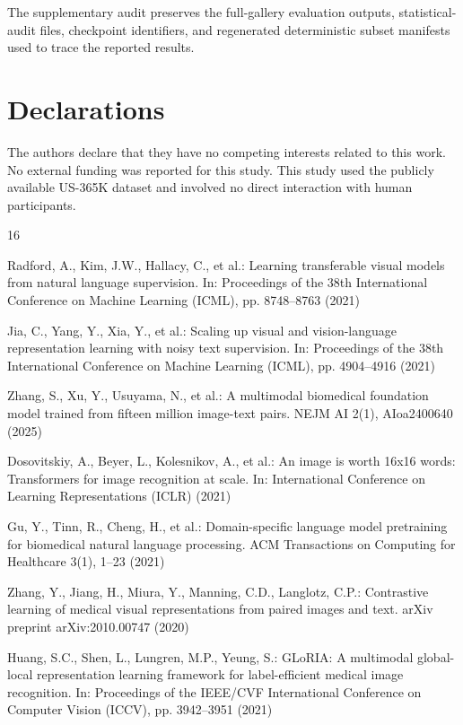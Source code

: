 \documentclass[runningheads]{llncs}
\begin{document}
The supplementary audit preserves the full-gallery evaluation outputs, statistical-audit files, checkpoint identifiers, and regenerated deterministic subset manifests used to trace the reported results.

\section*{Declarations}
The authors declare that they have no competing interests related to this work. No external funding was reported for this study. This study used the publicly available US-365K dataset and involved no direct interaction with human participants.

\begin{thebibliography}{16}
\scriptsize

Radford, A., Kim, J.W., Hallacy, C., et al.: Learning transferable visual models from natural language supervision. In: Proceedings of the 38th International Conference on Machine Learning (ICML), pp. 8748--8763 (2021)

Jia, C., Yang, Y., Xia, Y., et al.: Scaling up visual and vision-language representation learning with noisy text supervision. In: Proceedings of the 38th International Conference on Machine Learning (ICML), pp. 4904--4916 (2021)

Zhang, S., Xu, Y., Usuyama, N., et al.: A multimodal biomedical foundation model trained from fifteen million image-text pairs. NEJM AI 2(1), AIoa2400640 (2025)

Dosovitskiy, A., Beyer, L., Kolesnikov, A., et al.: An image is worth 16x16 words: Transformers for image recognition at scale. In: International Conference on Learning Representations (ICLR) (2021)

Gu, Y., Tinn, R., Cheng, H., et al.: Domain-specific language model pretraining for biomedical natural language processing. ACM Transactions on Computing for Healthcare 3(1), 1--23 (2021)

Zhang, Y., Jiang, H., Miura, Y., Manning, C.D., Langlotz, C.P.: Contrastive learning of medical visual representations from paired images and text. arXiv preprint arXiv:2010.00747 (2020)

Huang, S.C., Shen, L., Lungren, M.P., Yeung, S.: GLoRIA: A multimodal global-local representation learning framework for label-efficient medical image recognition. In: Proceedings of the IEEE/CVF International Conference on Computer Vision (ICCV), pp. 3942--3951 (2021)


\end{thebibliography}
\end{document}
